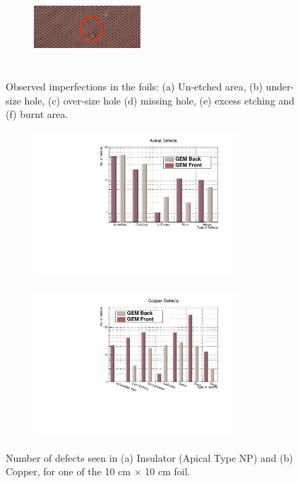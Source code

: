 \begin{figure}[!htbp]
\begin{subfigure}[b]{0.29\textwidth}
        \caption{ }
        \label{fig:O_5b}
    \end{subfigure}
    \centering
    \begin{subfigure}[b]{0.29\textwidth}
        \includegraphics[width=4cm, height=3cm]{figures/GEM/figures/3f.jpg}
        \caption{ }
        \label{fig:O_5c}
    \end{subfigure}
   \caption{Observed imperfections in the foils: (a) Un-etched area, (b) under-size hole, (c) over-size hole (d) missing hole, (e) excess etching and (f) burnt area.} \label{fig:Optical_01}
\end{figure}
\begin{figure}[!htbp]
    \centering
    \begin{subfigure}[b]{0.49\textwidth}
        \includegraphics[width=7.6cm, height=5.5cm]{figures/GEM/figures/Apical_Defects.pdf}\qquad
        \caption{ }
        \label{fig:O_9a}
    \end{subfigure}
    \begin{subfigure}[b]{0.49\textwidth}
        \includegraphics[width=7.6cm, height=5.5cm]{figures/GEM/figures/CopperDefects.pdf}
        \caption{ }
        \label{fig:O_9b}
    \end{subfigure}
   \caption{Number of defects seen in (a) Insulator (Apical Type NP) and (b) Copper, for one of the 10 cm $\times$ 10 cm foil.} \label{fig:Optical_04}
\end{figure}


